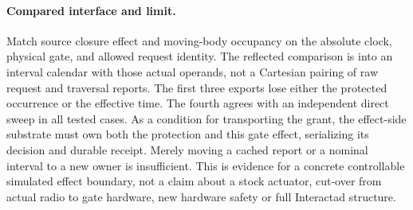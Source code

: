 \documentclass{article}
\begin{document}
\paragraph{Compared interface and limit.}
Match source closure effect and moving-body occupancy on the absolute
clock, physical gate, and allowed request identity. The reflected
comparison is into an interval calendar with those actual operands,
not a Cartesian pairing of raw request and traversal reports. The first
three exports lose either the protected occurrence or the effective
time. The fourth agrees with an independent direct sweep in all
tested cases. As a condition for transporting the grant, the effect-side
substrate must own both the protection and this gate effect, serializing
its decision and durable receipt. Merely moving a cached report or a
nominal interval to a new owner is insufficient. This is evidence for
a concrete controllable simulated effect boundary, not a claim about
a stock actuator, cut-over from actual radio to gate hardware, new
hardware safety or full Interactad structure.
\end{document}
